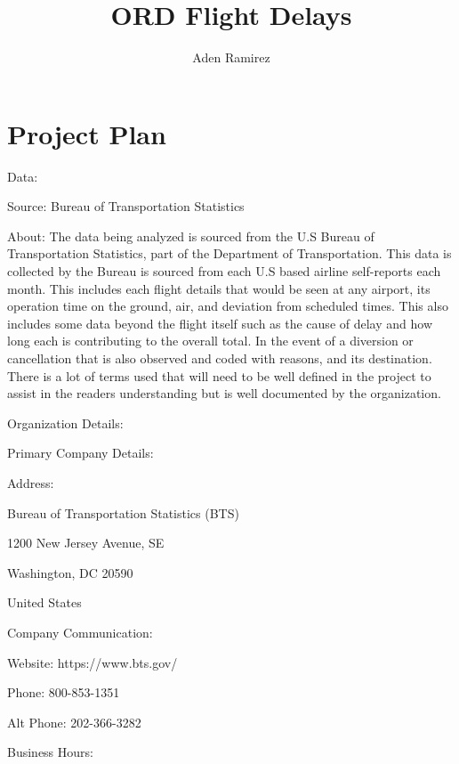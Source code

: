 \documentclass[a4paper,12pt]{article}
\begin{document}
\title{ORD Flight Delays}
\author{Aden Ramirez}
\maketitle

\begin{abstract}
\end{abstract}


\pagebreak

\tableofcontents

\pagebreak

\section{Project Plan}
Data:

Source: Bureau of Transportation Statistics

About:
The data being analyzed is sourced from the U.S Bureau of Transportation Statistics, part of the
Department of Transportation. This data is collected by the Bureau is sourced from each U.S
based airline self-reports each month. This includes each flight details that would be seen at
any airport, its operation time on the ground, air, and deviation from scheduled times. This also
includes some data beyond the flight itself such as the cause of delay and how long each is
contributing to the overall total. In the event of a diversion or cancellation that is also observed
and coded with reasons, and its destination. There is a lot of terms used that will need to be
well defined in the project to assist in the readers understanding but is well documented by the
organization.

Organization Details:

Primary Company Details:

Address:

Bureau of Transportation Statistics (BTS)

1200 New Jersey Avenue, SE

Washington, DC 20590

United States

Company Communication:

Website: https://www.bts.gov/

Phone: 800-853-1351

Alt Phone: 202-366-3282

Business Hours:
\end{document}
